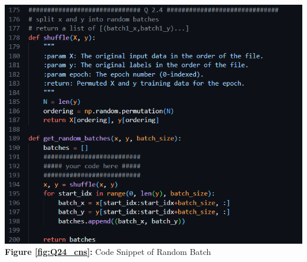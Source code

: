 \documentclass{article}
\begin{document}
	\begin{minipage}{0.48\linewidth}
		\centering
		\includegraphics[width=\linewidth]{./Q24_cns.png}
		\textbf{Figure \ref{fig:Q24_cns}:} Code Snippet of Random Batch %
		\label{fig:Q24_cns}         %
	\end{minipage}
	\hfill
\end{document}
